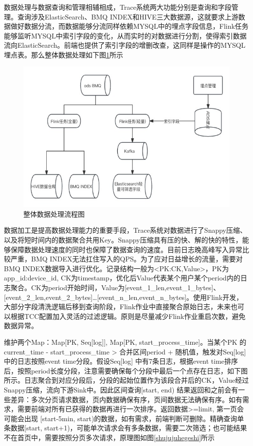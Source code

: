数据处理与数据查询和管理相辅相成，Trace系统两大功能分别是查询和字段管理。查询涉及ElasticSearch、BMQ INDEX和HIVE三大数据源，这就要求上游数据做好数据分流，而数据能够分流同样依赖MYSQL中的埋点字段信息，Flink任务能够监听MYSQL中索引字段的变化，从而实时的对数据进行分割，使得索引数据流向ElasticSearch。前端也提供了索引字段的增删改查，这同样是操作的MYSQL埋点表。那么整体数据处理如下图\ref{zhengtishujuchuli}所示

\begin{figure}[htb]
  \centering
  \includegraphics[width=5in]{figure/chapter4/整体数据处理流程图.jpg}
  \caption{整体数据处理流程图}\label{zhengtishujuchuli}
\end{figure}

数据加工是提高数据处理能力的重要手段，Trace系统对数据进行了Snappy压缩、以及将短时间内的数据聚合共用Key。Snappy压缩具有压的快、解的快的特性，能够保障数据处理速度的同时也保障了数据查询的速度。目前日志晚高峰写入异常比较严重，BMQ INDEX无法扛住写入的QPS。为了应对日益增长的流量，需要对BMQ INDEX数据导入进行优化。记录结构一般为<PK:CK,Value>，PK为app\_id:device\_id, CK为timestamp，优化后Value代表某个用户某个period内的日志聚合。CK为period开始时间，Value为[event\_1\_len,event\_1\_bytes]、[event\_2\_len,event\_2\_bytes]…[event\_n\_len,event\_n\_bytes]。使用Flink开发，大部分字段清洗逻辑后移到查询阶段，Flink作业中直接聚合原始日志，未来也可以根据TCC配置加入灵活的过滤逻辑。原则是尽量减少Flink作业重启次数，避免数据异常。

维护两个Map：Map[PK, Seq[log]], Map[PK, start\_process\_time]。当某个PK 的 current\_time - start\_process\_time > 合并区间period + 随机值，触发对Seq[log]中的日志按照event time分段。假设Seq[log] 中有7条日志，根据event time排序后，按照period长度分段，注意需要确保每个分段中最后一个点存在日志，如下图所示。日志聚合到对应分段后，分段的起始位置作为该段合并后的CK，Value经过Snappy压缩，流向下游Sink中。因此区间查询[start, end) 结果返回和之前会有一些差异：多次分页请求数据，页内数据确保有序，页间数据无法确保有序。如有需求，需要前端对所有已获得的数据再进行一次排序。返回数据>=limit, 第一页会可能会出现 [start-5min, start)的数据，如有需求，前端判断可删除。精确查询单条数据[start, start+1)，可能单次请求会有多条数据，需要二次筛选；也可能结果不在首页中，需要按照分页多次请求，原理图如图\ref{shujujuhegeshi}所示

